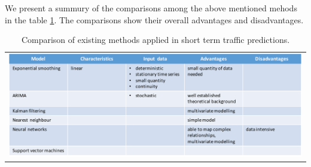 We present a summury of the comparisons among the above mentioned mehods in the table
\ref{table:comparisonExistingMethods}. The comparisons show their overall advantages and disadvantages.

\begin{table}
    \begin{tabular}{c}
        \includegraphics[width=\textwidth,height=\textheight,keepaspectratio]{Figures/method-comparisons.pdf}
    \end{tabular}
    \caption[Comparison of existing methods]{Comparison of existing methods applied in short term
     traffic predictions.}
    \label{table:comparisonExistingMethods}
\end{table}